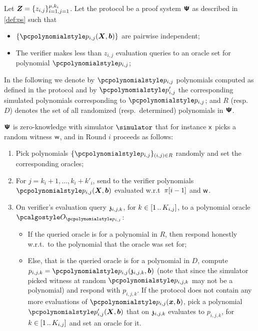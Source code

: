 \documentclass[runningheads,11pt]{llncs}
\let\spvec\vec
\let\vec\accentvec
\let\spvec\vec
\let\vec\spvec
\def\vec#1{\mathchoice{\mbox{\boldmath$\displaystyle#1$}}
  {\mbox{\boldmath$\textstyle#1$}} {\mbox{\boldmath$\scriptstyle#1$}}
  {\mbox{\boldmath$\scriptscriptstyle#1$}}}
\begin{document}
\begin{theorem}[$\vec{Z}$-Zero knowledge]
  \label{def:ips_zk}
  Let $\vec{Z} = \smallset{z_{i, j}}_{i = 1, j = 1}^{\mu, k_i}$. Let the protocol be
  a proof system $\bm{\mathsf{\Psi}}$ as described in \cref{def:ps} such that
  \begin{itemize}
  \item $\smallset{\p{p}_{i, j} (\vec{X}, \vec{b})}$ are pairwise independent;
  \item The verifier makes less than $z_{i, j}$ evaluation queries to an oracle set
    for polynomial $\p{p}_{i, j}$;
  \end{itemize}
  
  In the following we denote by $\p{p}_{i, j}$ polynomials computed as defined in the
  protocol and by $\p{p}'_{i, j}$ the corresponding simulated polynomials
  corresponding to $\p{p}_{i, j}$; and $R$ (resp.~$D$) denotes the set of all randomized
  (resp.~determined) polynomials in $\bm{\mathsf{\Psi}}$. 

  $\bm{\mathsf{\Psi}}$ is zero-knowledge with simulator $\simulator$ that for instance $\mathsf{x}$ picks
  a random witness $\mathsf{w}$, and in Round $i$ proceeds as follows:
  \begin{enumerate}
  \item Pick polynomials $\smallset{\p{p}_{i, j}}_{(i, j) \in R}$ randomly and set
    the corresponding oracles;
  \item For $j = k_i + 1, \ldots, k_i + k'_i$, send to the verifier polynomials
    $\p{p}_{i, j} (\vec{X}, \vec{b})$ evaluated w.r.t~$\pi[i - 1]$ and
    $\mathsf{w}$. 
  \item On verifier's evaluation query $\mathfrak{z}_{i, j, k}$, for $k \in [1 \, .. \, K_{i, j}]$, to a
    polynomial oracle $\oracleo_{\p{p}_{i, j}}$:
    \begin{itemize}
    \item If the queried oracle is for a polynomial in $R$, then respond honestly
      w.r.t.~to the polynomial that the oracle was set for;
    \item Else, that is the queried oracle is for a polynomial in $D$, compute
      $p_{i, j, k} = \p{p}_{i, j} (\chz_{i, j, k}, \vec{b})$ (note that since the
      simulator picked witness at random $\p{p}_{i, j, k}$ may not be a polynomial)
      and respond with $p_{i, j, k}$. If the protocol does not contain any more
      evaluations of $\p{p}_{i, j} (\vec{x}, \vec{b})$, pick a polynomial
      $\p{p}'_{i, j} (\vec{X}, \vec{b})$ that on $\mathfrak{z}_{i, j, k}$ evaluates to
      $p_{i, j, k}$, for $k \in [1 \, .. \, K_{i, j}]$ and set an oracle for it.
    \end{itemize}
  \end{enumerate}
\end{theorem}
\end{document}
